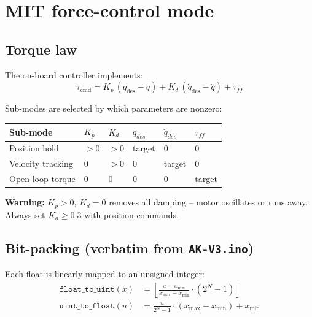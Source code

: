 \documentclass[11pt,a4paper]{article}
\begin{document}
\section{MIT force-control mode}
\label{sec:mit}

\subsection{Torque law}

The on-board controller implements:
\begin{equation}
  \tau_{\text{cmd}} =
    K_p\,(q_{\text{des}} - q)
  + K_d\,(\dot{q}_{\text{des}} - \dot{q})
  + \tau_{ff}
  \label{eq:mit}
\end{equation}

Sub-modes are selected by which parameters are nonzero:

\begin{center}\small
\begin{tabular}{llllll}
\toprule
Sub-mode & $K_p$ & $K_d$ & $q_{des}$ & $\dot{q}_{des}$ & $\tau_{ff}$ \\
\midrule
Position hold     & $> 0$ & $> 0$ & target & 0 & 0 \\
Velocity tracking & 0     & $> 0$ & 0      & target & 0 \\
Open-loop torque  & 0     & 0     & 0      & 0 & target \\
\bottomrule
\end{tabular}
\end{center}

\textbf{Warning:} $K_p > 0$, $K_d = 0$ removes all damping -- motor
oscillates or runs away.  Always set $K_d \ge 0.3$ with position commands.

\subsection{Bit-packing (verbatim from \texttt{AK-V3.ino})}

Each float is linearly mapped to an unsigned integer:
\begin{align}
  \texttt{float\_to\_uint}(x) &= \left\lfloor
    \frac{x - x_{\min}}{x_{\max} - x_{\min}} \cdot (2^N - 1)
  \right\rfloor \label{eq:f2u} \\
  \texttt{uint\_to\_float}(u) &= \frac{u}{2^N - 1} \cdot (x_{\max} - x_{\min}) + x_{\min}
  \label{eq:u2f}
\end{align}
\end{document}
